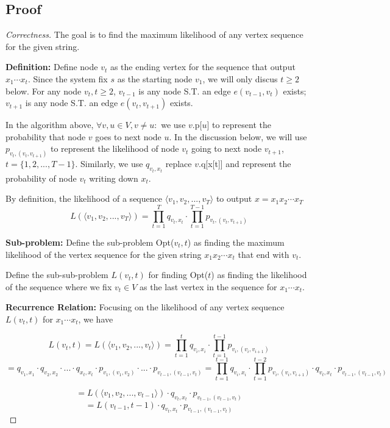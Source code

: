 \documentclass[openany]{article}
\begin{document}
\subsection*{Proof}
\begin{proof}[Correctness]{} The goal is to find the maximum likelihood of any vertex sequence for the given string.

\textbf{Definition:} 
Define node $v_t$ as the ending vertex for the sequence that output $x_1\cdots x_t$. Since the system fix $s$ as the starting node $v_1$, we will only discus $t\geq 2$ below. For any node $v_t, t\geq 2$, $v_{t-1}$ is any node S.T. an edge $e(v_{t-1}, v_{t})$ exists; $v_{t+1}$ is any node S.T. an edge $e(v_t, v_{t+1})$ exists.

In the algorithm above, $\forall v,u\in V, v\neq u:$  we use $v$.p[$u$] to represent the probability that node $v$ goes to next node $u$. In the discussion below, we will use $p_{v_t,(v_t,v_{t+1})}$ to represent the likelihood of node $v_t$ going to next node $v_{t+1}$, $ t=\{1,2,...,T-1\}$. Similarly, we use $q_{v_t,x_t}$ replace $v.$q[x[t]] and represent the probability of node $v_t$ writing down $x_t$. 

By definition, the likelihood of a sequence $\langle v_1,v_2,...,v_T \rangle$ to output $x=x_1x_2\cdots x_T$
\[L(\langle v_1,v_2,...,v_T \rangle) = \prod_{t=1}^{T}q_{v_t,x_t} \cdot \prod_{t=1}^{T-1}p_{v_t,(v_t,v_{t+1})}  \]
    
\textbf{Sub-problem:} Define the sub-problem Opt($v_t, t$) as finding the maximum likelihood of the vertex sequence for the given string $x_1x_2\cdots x_t$ that end with $v_t$.

Define the sub-sub-problem $L(v_t,t)$ for finding Opt($t$) as finding the likelihood of the sequence where we fix $v_t\in V$ as the last vertex in the sequence for $x_1 \cdots x_t$.
    
\textbf{Recurrence Relation:} Focusing on the likelihood of any vertex sequence $L(v_t,t)$ for $x_1\cdots x_t$, we have

\[L(v_t,t)=L(\langle v_1,v_2,...,v_t \rangle)=
\prod_{t=1}^{t}q_{v_i,x_i} \cdot \prod_{t=1}^{t-1}p_{v_i,(v_i,v_{i+1})}\]
\[=q_{v_1,x_1}\cdot q_{v_2,x_2} \cdot ... \cdot q_{x_t, x_t} \cdot p_{v_1,(v_1, v_2)} \cdot ...\cdot p_{v_{t-1},(v_{t-1}, v_{t})}=\prod_{t=1}^{t-1}q_{v_i,x_i} \cdot \prod_{t=1}^{t-2}p_{v_i,(v_i,v_{i+1})} \cdot q_{v_t,x_t} \cdot p_{v_{t-1},(v_{t-1},v_t)}\]


\[= L(\langle v_1,v_2,...,v_{t-1} \rangle)\cdot q_{v_t,x_t} \cdot p_{v_{t-1},(v_{t-1},v_t)} \]
\[= L(v_{t-1}, t-1) \cdot q_{v_t,x_t} \cdot p_{v_{t-1},(v_{t-1},v_t)}  \]



\end{proof}
\end{document}
